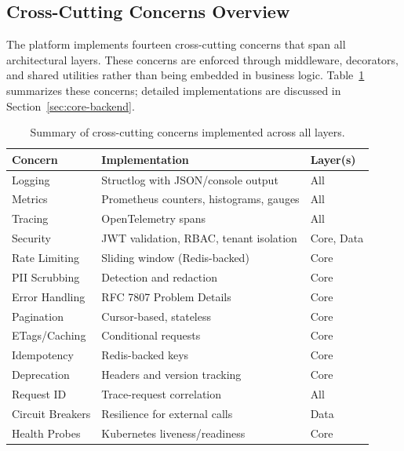 \subsection{Cross-Cutting Concerns Overview}

The platform implements fourteen cross-cutting concerns that span all architectural layers. These concerns are enforced through middleware, decorators, and shared utilities rather than being embedded in business logic. Table~\ref{tab:cross-cutting-summary} summarizes these concerns; detailed implementations are discussed in Section~\ref{sec:core-backend}.

\begin{table}[htbp]
    \centering
    \caption{Summary of cross-cutting concerns implemented across all layers.}
    \label{tab:cross-cutting-summary}
    \small
    \begin{tabular}{lll}
        \toprule
        \textbf{Concern} & \textbf{Implementation} & \textbf{Layer(s)} \\
        \midrule
        Logging & Structlog with JSON/console output & All \\
        Metrics & Prometheus counters, histograms, gauges & All \\
        Tracing & OpenTelemetry spans & All \\
        Security & JWT validation, RBAC, tenant isolation & Core, Data \\
        Rate Limiting & Sliding window (Redis-backed) & Core \\
        PII Scrubbing & Detection and redaction & Core \\
        Error Handling & RFC 7807 Problem Details & Core \\
        Pagination & Cursor-based, stateless & Core \\
        ETags/Caching & Conditional requests & Core \\
        Idempotency & Redis-backed keys & Core \\
        Deprecation & Headers and version tracking & Core \\
        Request ID & Trace-request correlation & All \\
        Circuit Breakers & Resilience for external calls & Data \\
        Health Probes & Kubernetes liveness/readiness & Core \\
        \bottomrule
    \end{tabular}
\end{table}

